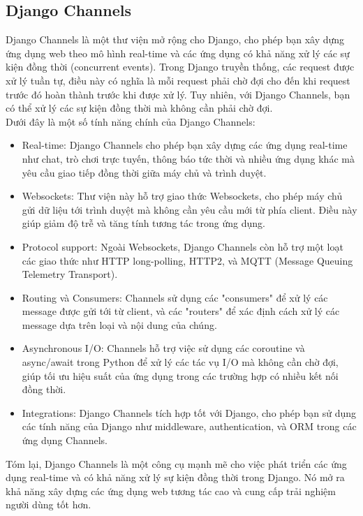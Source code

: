 \documentclass[a4paper]{article}
\begin{document}
\subsection{Django Channels}
Django Channels là một thư viện mở rộng cho Django, cho phép bạn xây dựng ứng dụng web theo mô hình real-time và các ứng dụng có khả năng xử lý các sự kiện đồng thời (concurrent events). Trong Django truyền thống, các request được xử lý tuần tự, điều này có nghĩa là mỗi request phải chờ đợi cho đến khi request trước đó hoàn thành trước khi được xử lý. Tuy nhiên, với Django Channels, bạn có thể xử lý các sự kiện đồng thời mà không cần phải chờ đợi.\\

Dưới đây là một số tính năng chính của Django Channels: \\
\begin{itemize}
    \item Real-time: Django Channels cho phép bạn xây dựng các ứng dụng real-time như chat, trò chơi trực tuyến, thông báo tức thời và nhiều ứng dụng khác mà yêu cầu giao tiếp đồng thời giữa máy chủ và trình duyệt.
    \item Websockets: Thư viện này hỗ trợ giao thức Websockets, cho phép máy chủ gửi dữ liệu tới trình duyệt mà không cần yêu cầu mới từ phía client. Điều này giúp giảm độ trễ và tăng tính tương tác trong ứng dụng.
    \item Protocol support: Ngoài Websockets, Django Channels còn hỗ trợ một loạt các giao thức như HTTP long-polling, HTTP2, và MQTT (Message Queuing Telemetry Transport).
    \item Routing và Consumers: Channels sử dụng các "consumers" để xử lý các message được gửi tới từ client, và các "routers" để xác định cách xử lý các message dựa trên loại và nội dung của chúng.
    \item Asynchronous I/O: Channels hỗ trợ việc sử dụng các coroutine và async/await trong Python để xử lý các tác vụ I/O mà không cần chờ đợi, giúp tối ưu hiệu suất của ứng dụng trong các trường hợp có nhiều kết nối đồng thời.
    \item Integrations: Django Channels tích hợp tốt với Django, cho phép bạn sử dụng các tính năng của Django như middleware, authentication, và ORM trong các ứng dụng Channels.
\end{itemize}

Tóm lại, Django Channels là một công cụ mạnh mẽ cho việc phát triển các ứng dụng real-time và có khả năng xử lý sự kiện đồng thời trong Django. Nó mở ra khả năng xây dựng các ứng dụng web tương tác cao và cung cấp trải nghiệm người dùng tốt hơn.
\end{document}
